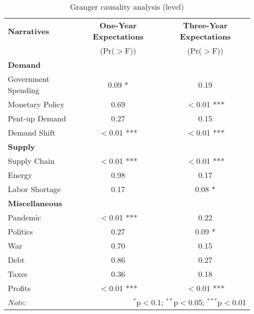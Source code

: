 \begin{table}[ht]
\centering
\caption{Granger causality analysis (level)}\label{table:granger}

\begin{tabular}{lcc}
\toprule
\textbf{Narratives} & \textbf{One-Year Expectations} & \textbf{Three-Year Expectations} \\
& (Pr($>$F)) & (Pr($>$F)) \\
\midrule
\multicolumn{3}{l}{\textbf{Demand}} \\
\midrule
Government Spending & 0.09 * & 0.19 \\
Monetary Policy & 0.69 & $<$0.01 *** \\
Pent-up Demand & 0.27 & 0.15 \\
Demand Shift & $<$0.01 *** & $<$0.01 *** \\
\midrule
\multicolumn{3}{l}{\textbf{Supply}} \\
\midrule
Supply Chain & $<$0.01 *** & $<$0.01 *** \\
Energy & 0.98 & 0.17 \\
Labor Shortage & 0.17 & 0.08 * \\
\midrule
\multicolumn{3}{l}{\textbf{Miscellaneous}} \\
\midrule
Pandemic & $<$0.01 *** & 0.22 \\
Politics & 0.27 & 0.09 * \\
War & 0.70 & 0.15 \\
Debt & 0.86 & 0.27 \\
Taxes & 0.36 & 0.18 \\
Profits & $<$0.01 *** & $<$0.01 *** \\
\midrule
\bottomrule
\textit{Note:}  & \multicolumn{2}{r}{$^{*}$p$<$0.1; $^{**}$p$<$0.05; $^{***}$p$<$0.01} \\
\bottomrule
\end{tabular}
\end{table}
